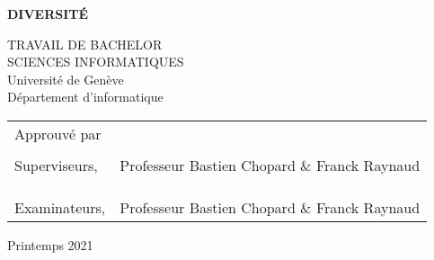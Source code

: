 \thispagestyle{empty}

\vspace*{+5em}
\begin{center}
\textbf{DIVERSITÉ}\\
\vspace*{+4em}

\vspace{+2em}
TRAVAIL DE BACHELOR\\
SCIENCES INFORMATIQUES\\

\vspace*{+3em}
Université de Genève\\
Département d'informatique\\
\vspace*{+2em}

\end{center}

\begin{tabular}{ l l }
 Approuvé par &   \\
  & \\
  Superviseurs, & Professeur Bastien Chopard \& Franck Raynaud  \\ 
  & \\
  & \\
  & \\
 Examinateurs, & Professeur Bastien Chopard \& Franck Raynaud \\ 
\end{tabular}

\vspace*{+4em}

\begin{center}
Printemps 2021
\end{center}

